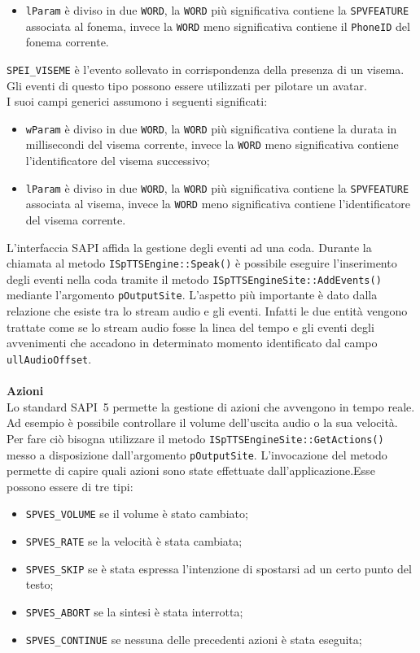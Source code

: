 \begin{description}
\begin{itemize}
		\item \texttt{lParam} è diviso in due \texttt{WORD}, la \texttt{WORD} più significativa contiene la \texttt{SPVFEATURE} associata al fonema, invece la \texttt{WORD} meno significativa contiene il \texttt{PhoneID} del fonema corrente.
	\end{itemize}
	\item [] \texttt{SPEI\_VISEME} è l'evento sollevato in corrispondenza della presenza di un visema. Gli eventi di questo tipo possono essere utilizzati per pilotare un avatar.\\
	I suoi campi generici assumono i seguenti significati:
	\begin{itemize}
		\item \texttt{wParam} è diviso in due \texttt{WORD}, la \texttt{WORD} più significativa contiene la durata in millisecondi del visema corrente, invece la \texttt{WORD} meno significativa contiene l'identificatore del visema successivo;
		\item \texttt{lParam} è diviso in due \texttt{WORD}, la \texttt{WORD} più significativa contiene la \texttt{SPVFEATURE} associata al visema, invece la \texttt{WORD} meno significativa contiene l'identificatore del visema corrente.
	\end{itemize}
\end{description}
L'interfaccia SAPI affida la gestione degli eventi ad una coda. Durante la chiamata al metodo \texttt{ISpTTSEngine::Speak()} è possibile eseguire l'inserimento degli eventi nella coda tramite il metodo \texttt{ISpTTSEngineSite::AddEvents()} mediante l'argomento \texttt{pOutputSite}.
L'aspetto più importante è dato dalla relazione che esiste tra lo stream audio e gli eventi. Infatti le due entità vengono trattate come se lo stream audio fosse la linea del tempo e gli eventi degli avvenimenti che accadono in determinato momento identificato dal campo \texttt{ullAudioOffset}.
\\\\
\textbf{Azioni}\\
Lo standard SAPI~5 permette la gestione di azioni che avvengono in tempo reale. Ad esempio è possibile controllare il volume dell'uscita audio o la sua velocità.
Per fare ciò bisogna utilizzare il metodo \texttt{ISpTTSEngineSite::GetActions()} messo a disposizione dall'argomento \texttt{pOutputSite}.
L'invocazione del metodo permette di capire quali azioni sono state effettuate dall'applicazione.Esse possono essere di tre tipi:
\begin{itemize}
	\item \texttt{SPVES\_VOLUME} se il volume è stato cambiato;
	\item \texttt{SPVES\_RATE} se la velocità è stata cambiata;
	\item \texttt{SPVES\_SKIP} se è stata espressa l'intenzione di spostarsi ad un certo punto del testo;
	\item \texttt{SPVES\_ABORT} se la sintesi è stata interrotta;
	\item \texttt{SPVES\_CONTINUE} se nessuna delle precedenti azioni è stata eseguita;
\end{itemize}
